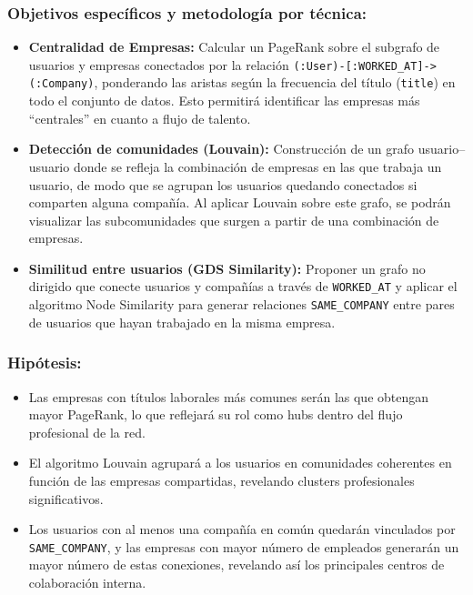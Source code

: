 \documentclass[10pt]{article}
\begin{document}
\subsubsection{Objetivos específicos y metodología por técnica:}

\begin{itemize}
	\item \textbf{Centralidad de Empresas:}
	      Calcular un PageRank sobre el subgrafo de usuarios y empresas conectados por la relación \texttt{(:User)-[:WORKED\_AT]->(:Company)}, ponderando las aristas según la frecuencia del título (\texttt{title}) en todo el conjunto de datos. Esto permitirá identificar las empresas más “centrales” en cuanto a flujo de talento.
	      
	\item \textbf{Detección de comunidades (Louvain):}
	      Construcción de un grafo usuario–usuario donde se refleja la combinación de empresas en las que trabaja un usuario, de modo que se agrupan los usuarios quedando conectados si comparten alguna compañía. Al aplicar Louvain sobre este grafo, se podrán visualizar las subcomunidades que surgen a partir de una combinación de empresas.
	      
	\item \textbf{Similitud entre usuarios (GDS Similarity):}
	      Proponer un grafo no dirigido que conecte usuarios y compañías a través de \texttt{WORKED\_AT} y aplicar el algoritmo Node Similarity para generar relaciones \texttt{SAME\_COMPANY} entre pares de usuarios que hayan trabajado en la misma empresa.
\end{itemize}

\subsubsection{Hipótesis:}

\begin{itemize}
	\item Las empresas con títulos laborales más comunes serán las que obtengan mayor PageRank, lo que reflejará su rol como hubs dentro del flujo profesional de la red.
	      
	\item El algoritmo Louvain agrupará a los usuarios en comunidades coherentes en función de las empresas compartidas, revelando clusters profesionales significativos.
	      
	\item Los usuarios con al menos una compañía en común quedarán vinculados por \texttt{SAME\_COMPANY}, y las empresas con mayor número de empleados generarán un mayor número de estas conexiones, revelando así los principales centros de colaboración interna.
\end{itemize}
\end{document}
